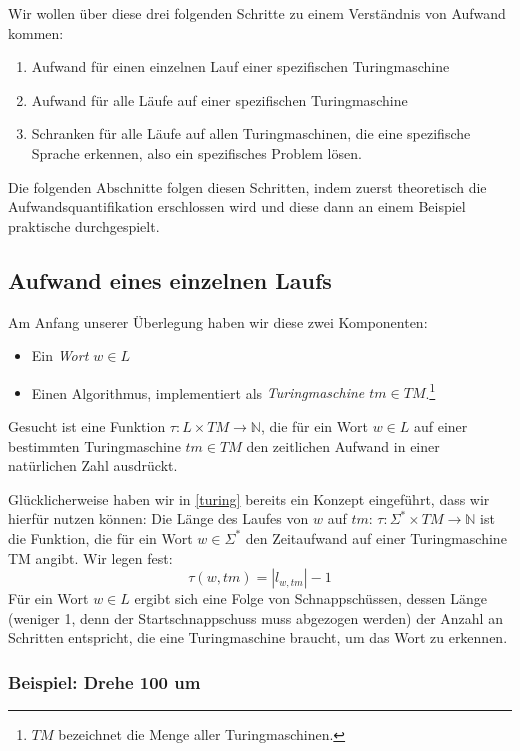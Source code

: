 Wir wollen über diese drei folgenden Schritte zu einem Verständnis von Aufwand kommen:
\begin{enumerate}
    \item Aufwand für einen einzelnen Lauf einer spezifischen Turingmaschine
    \item Aufwand für alle Läufe auf einer spezifischen Turingmaschine
    \item Schranken für alle Läufe auf allen Turingmaschinen,
        die eine spezifische Sprache erkennen, also ein spezifisches Problem lösen.
\end{enumerate}

Die folgenden Abschnitte folgen diesen Schritten,
indem zuerst theoretisch die Aufwandsquantifikation erschlossen wird
und diese dann an einem Beispiel praktische durchgespielt.

\subsection{Aufwand eines einzelnen Laufs}
Am Anfang unserer Überlegung haben wir diese zwei Komponenten:
\begin{itemize}
    \item Ein \emph{Wort $w \in L$}
    \item Einen Algorithmus,
        implementiert als \emph{Turingmaschine $tm \in TM$}.\footnote{%
            $TM$ bezeichnet die Menge aller Turingmaschinen.}
\end{itemize}
Gesucht ist eine Funktion $\tau: L \times TM \rightarrow \mathbb{N}$,
die für ein Wort $w \in L$ auf einer bestimmten Turingmaschine $tm \in TM$
den zeitlichen Aufwand in einer natürlichen Zahl ausdrückt.

Glücklicherweise haben wir in \autoref{turing} bereits ein Konzept eingeführt,
dass wir hierfür nutzen können:
Die Länge des Laufes von $w$ auf $tm$:
$\tau: \Sigma^* \times TM \rightarrow \mathbb{N}$ ist die Funktion,
die für ein Wort $w \in \Sigma^*$ den Zeitaufwand auf einer Turingmaschine TM angibt.
Wir legen fest:
\[
    \tau(w,tm) = |l_{w,tm}| - 1
\]
Für ein Wort $w \in L$ ergibt sich eine Folge von Schnappschüssen,
dessen Länge (weniger 1, denn der Startschnappschuss muss abgezogen werden)
der Anzahl an Schritten entspricht,
die eine Turingmaschine braucht,
um das Wort zu erkennen.

\subsubsection{Beispiel: Drehe 100 um}

